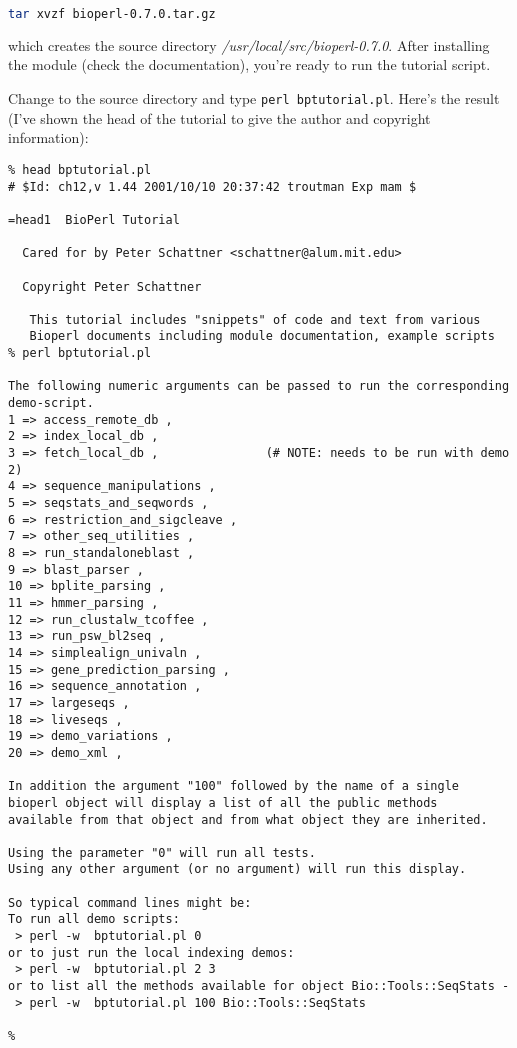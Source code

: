 \begin{lstlisting}[language=bash]
tar xvzf bioperl-0.7.0.tar.gz
\end{lstlisting}

which creates the source directory \textit{/usr/local/src/bioperl-0.7.0}. After installing the module (check the documentation), you're ready to run the tutorial script.

Change to the source directory and type \verb|perl bptutorial.pl|. Here's the result (I've shown the head of the tutorial to give the author and copyright information): 

\begin{lstlisting}
% head bptutorial.pl 
# $Id: ch12,v 1.44 2001/10/10 20:37:42 troutman Exp mam $

=head1  BioPerl Tutorial

  Cared for by Peter Schattner <schattner@alum.mit.edu>

  Copyright Peter Schattner

   This tutorial includes "snippets" of code and text from various
   Bioperl documents including module documentation, example scripts
% perl bptutorial.pl 

The following numeric arguments can be passed to run the corresponding demo-script.
1 => access_remote_db ,
2 => index_local_db ,
3 => fetch_local_db ,               (# NOTE: needs to be run with demo 2)
4 => sequence_manipulations ,
5 => seqstats_and_seqwords ,
6 => restriction_and_sigcleave ,
7 => other_seq_utilities ,
8 => run_standaloneblast ,
9 => blast_parser ,
10 => bplite_parsing ,
11 => hmmer_parsing ,
12 => run_clustalw_tcoffee ,
13 => run_psw_bl2seq ,
14 => simplealign_univaln ,
15 => gene_prediction_parsing ,
16 => sequence_annotation ,
17 => largeseqs ,
18 => liveseqs ,
19 => demo_variations ,
20 => demo_xml ,

In addition the argument "100" followed by the name of a single
bioperl object will display a list of all the public methods
available from that object and from what object they are inherited.

Using the parameter "0" will run all tests.
Using any other argument (or no argument) will run this display.

So typical command lines might be:
To run all demo scripts:
 > perl -w  bptutorial.pl 0
or to just run the local indexing demos:
 > perl -w  bptutorial.pl 2 3
or to list all the methods available for object Bio::Tools::SeqStats -
 > perl -w  bptutorial.pl 100 Bio::Tools::SeqStats

%
\end{lstlisting}

